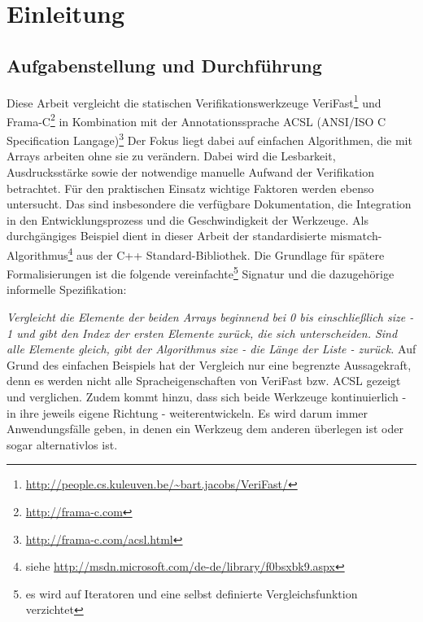 ﻿\chapter{Einleitung}

\section{Aufgabenstellung und Durchführung}
\label{sec:aufgabenstellung}
Diese Arbeit vergleicht die statischen Verifikationswerkzeuge VeriFast\footnote{
\url{http://people.cs.kuleuven.be/~bart.jacobs/VeriFast/}} und Frama-C\footnote{\url{http://frama-c.com}} in Kombination
mit der Annotationssprache ACSL (ANSI/ISO C Specification Langage)\footnote{\url{http://frama-c.com/acsl.html}} 
Der Fokus liegt dabei auf einfachen Algorithmen, die mit Arrays arbeiten ohne sie zu verändern.
Dabei wird die Lesbarkeit, Ausdrucksstärke sowie der notwendige manuelle Aufwand der Verifikation betrachtet.
Für den praktischen Einsatz wichtige Faktoren werden ebenso untersucht. Das sind insbesondere die verfügbare 
Dokumentation, die Integration in den Entwicklungsprozess und die Geschwindigkeit der Werkzeuge.
\newline
\newline
Als durchgängiges Beispiel dient in dieser Arbeit der standardisierte mismatch-Algorithmus\footnote{siehe
\url{http://msdn.microsoft.com/de-de/library/f0bsxbk9.aspx}} aus
der C++ Standard-Bibliothek. Die Grundlage für spätere Formalisierungen ist die folgende vereinfachte\footnote{es
wird auf Iteratoren und eine selbst definierte Vergleichsfunktion verzichtet} Signatur und 
die dazugehörige informelle Spezifikation:

\lstset{frame=none, numbers=none}    

\lstset{frame=single}

\noindent \emph{Vergleicht die Elemente der beiden Arrays beginnend bei 0 bis einschließlich size - 1 und gibt den
Index der ersten Elemente zurück, die sich unterscheiden. Sind alle Elemente gleich, gibt der Algorithmus
size - die Länge der Liste - zurück.}
\newline
\newline
Auf Grund des einfachen Beispiels hat der Vergleich nur eine begrenzte Aussagekraft, denn es werden nicht alle
Spracheigenschaften von VeriFast bzw. ACSL gezeigt und verglichen. Zudem kommt hinzu, dass sich beide Werkzeuge
kontinuierlich - in ihre jeweils eigene Richtung - weiterentwickeln. Es wird darum immer Anwendungsfälle geben,
in denen ein Werkzeug dem anderen überlegen ist oder sogar alternativlos ist.


